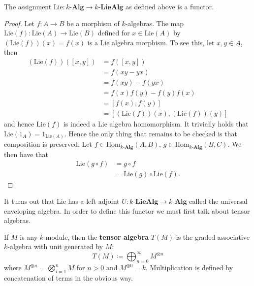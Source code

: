 \begin{lemma}
  \label{lem:functoriality}
  The assignment $ \text{Lie}:k\text{-}\mathbf{Alg} \to k\text{-}\mathbf{LieAlg} $ as defined above is a functor.
\end{lemma}
\begin{proof}
  Let $ f: A \to B $ be a morphism of $ k $-algebras. The map $ \text{Lie}(f):\text{Lie}(A) \to \text{Lie}(B) $ defined for $ x \in \text{Lie}(A) $ by $ (\text{Lie}(f))(x)=f(x) $ is a Lie algebra morphism. To see this, let $ x,y \in A $, then
  \begin{align*}
    (\text{Lie}(f))([x,y]) &= f([x,y]) \\
                           &= f(xy - yx) \\
                           &= f(xy) - f(yx) \\
                           &= f(x)f(y) - f(y)f(x) \\
                           &= [f(x), f(y)] \\
                           &= [(\text{Lie}(f))(x), (\text{Lie}(f))(y)]
  \end{align*}
  and hence $ \text{Lie}(f) $ is indeed a Lie algebra homomorphism. It trivially holds that $ \text{Lie}(1_A) = 1_{\text{Lie}(A)} $. Hence the only thing that remains to be checked is that composition is preserved. Let $ f \in \text{Hom}_{k\text{-}\mathbf{Alg}}(A,B) $, $ g \in \text{Hom}_{k\text{-}\mathbf{Alg}}(B,C) $. We then have that
  \begin{align*}
    \text{Lie}(g \circ f) &= g \circ f \\
                          &= \text{Lie}(g) \circ \text{Lie}(f)
  .\end{align*}
\end{proof}

It turns out that Lie has a left adjoint $ U: k\text{-}\mathbf{LieAlg} \to k\text{-}\mathbf{Alg} $ called the universal enveloping algebra. In order to define this functor we must first talk about tensor algebras.

\begin{definition}
  If $ M $ is any $ k $-module, then the \textbf{tensor algebra} $ T(M) $ is the graded associative $ k $-algebra with unit generated by $ M $:
  \begin{equation}
    T(M) \coloneqq \bigoplus_{n = 0}^{\infty} M^{\otimes n}
    \label{eq:gaa}
  \end{equation}
  where $ M^{\otimes n} = \bigotimes_{i = 1}^{n} M $ for $ n>0 $ and $ M^{\otimes 0}=k $. Multiplication is defined by concatenation of terms in the obvious way.
\end{definition}

